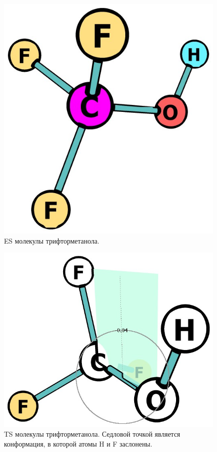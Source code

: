 \begin{figure}[H]
\centering
\captionsetup{justification=centering}
\includegraphics[scale=0.3]{fig/0.jpg}
\caption{ES молекулы трифторметанола.}
\end{figure}

\begin{figure}[H]
\centering
\captionsetup{justification=centering}
\includegraphics[scale=0.3]{fig/1.jpg}
\caption{TS молекулы трифторметанола. Седловой точкой является конформация, в которой атомы H и F заслонены.}
\end{figure}
